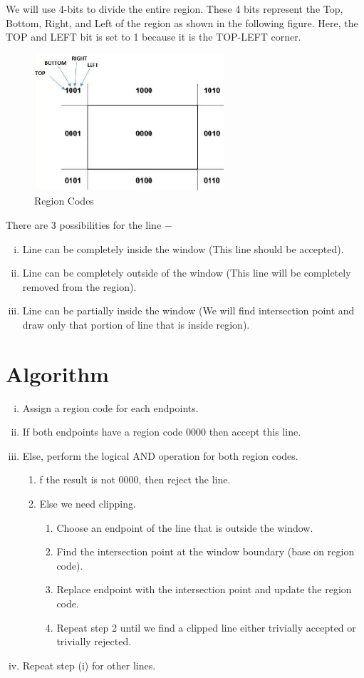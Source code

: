 \documentclass[11pt]{report}
\begin{document}
We will use 4-bits to divide the entire region. These 4 bits represent the Top, Bottom, Right, and Left of the region as shown in the following figure. Here, the TOP and LEFT bit is set to 1 because it is the TOP-LEFT corner.
\begin{figure}[!htb]
	\centering
	\includegraphics[height=2.0in]{reg_code}
	\caption{Region Codes}
\end{figure}


There are 3 possibilities for the line −
\begin{enumerate}[(i)]
	\item Line can be completely inside the window (This line should be accepted).
	
	\item Line can be completely outside of the window (This line will be completely removed from the region).
	
	\item Line can be partially inside the window (We will find intersection point and draw only that portion of line that is inside region).
\end{enumerate}
\section{Algorithm}

\begin{enumerate}[(i)]
	\item Assign a region code for each endpoints.
	\item If both endpoints have a region code 0000 then accept this line.
	\item Else, perform the logical AND operation for both region codes.
	\begin{enumerate}[1]
		\item f the result is not 0000, then reject the line.
		\item Else we need clipping.
		\begin{enumerate}[I]
			\item Choose an endpoint of the line that is outside the window.
			\item Find the intersection point at the window boundary (base on region code).
			\item Replace endpoint with the intersection point and update the region code.
			\item Repeat step 2 until we find a clipped line either trivially accepted or trivially rejected.
			
		\end{enumerate}
	\end{enumerate}
	\item Repeat step (i) for other lines.
\end{enumerate}
\end{document}
